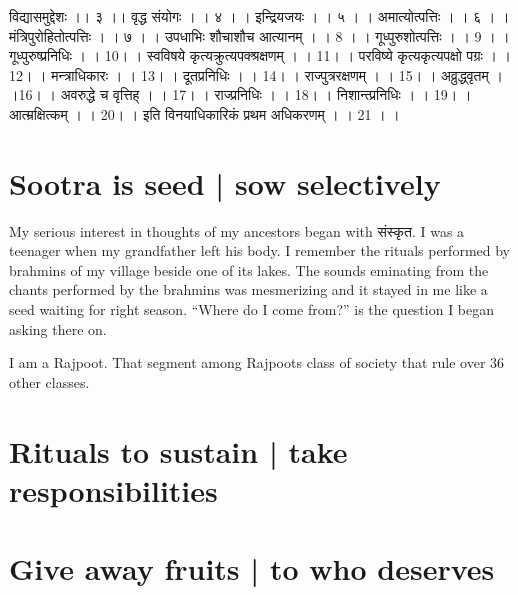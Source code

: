 \documentclass[oneside,11pt]{memoir} %
\begin{document}
विद्यासमुद्देशः ।। ३ ।। वृद्ध संयोगः । । ४ । । इन्द्रियजयः । । ५ । ।  अमात्योत्पत्तिः । । ६ । ।  मंत्रिपुरोहितोत्पत्तिः । । ७ । । उपधाभिः शौचाशौच आत्यानम् । । 8 । ।  गूध्पुरुशोत्पत्तिः । । 9 । ।  गूध्पुरुष्प्रनिधिः । । 10। । स्वविषये कृत्यक्रुत्यपक्श्रक्षणम् । । 11। । परविष्ये कृत्यकृत्यपक्षो पग्रः । । 12। । मन्त्राधिकारः । । 13। । दूतप्रनिधिः । । 14। ।  राज्पुत्ररक्षणम् । । 15। । अव्रुद्ध्वृतम् । ।16। । अवरुद्धे च वृत्तिह्  । । 17। ।  राज्प्रनिधिः । । 18। । निशान्त्प्रनिधिः । । 19। । आत्म्रक्षित्कम् । । 20। ।  इति विनयाधिकारिकं प्रथम अधिकरणम् । । 21 । । 




\chapter{Sootra is seed | sow selectively}

My serious interest in thoughts of my ancestors began with संस्कृत. I was a teenager when my grandfather left his body. I remember the rituals performed by brahmins of my village beside one of its lakes. The sounds eminating from the chants performed by the brahmins was mesmerizing and it stayed in me like a seed waiting for right season. ``Where do I come from?'' is the question I began asking there on.

I am a Rajpoot. That segment among Rajpoots class of society that rule over 36 other classes.


\chapter{Rituals to sustain | take responsibilities}



\chapter{Give away fruits | to who deserves}



\end{document}
